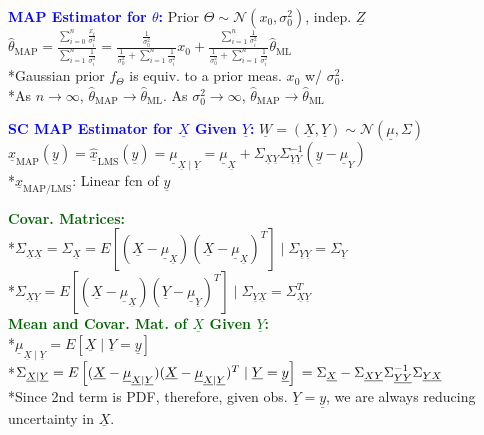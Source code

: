 \documentclass[5pt]{extarticle} %
\begin{document}
\begin{paracol}{3}
{    \textcolor{blue}{\textbf{MAP Estimator for $\theta$:}} Prior $\Theta \sim \mathcal{N} (x_0, \sigma_0^2)$, indep. $\underline{Z}$ \\
    $\hat{\theta}_{\text{MAP}} = \frac{\sum_{i=0}^n \frac{x_i}{\sigma_i^2}}{\sum_{i=1}^n \frac{1}{\sigma_i^2}} = \frac{\frac{1}{\sigma_0^2}}{\frac{1}{\sigma_0^2} + \sum_{i=1}^n \frac{1}{\sigma_i^2}} x_0 + \frac{\sum_{i=1}^n \frac{1}{\sigma_i^2}}{\frac{1}{\sigma_0^2} + \sum_{i=1}^n \frac{1}{\sigma_i^2}} \hat{\theta}_{\text{ML}}$ \\
    *Gaussian prior $f_\Theta$ is equiv. to a prior meas. $x_0$ w/ $\sigma_0^2$. \\
    *As $n \rightarrow \infty$, $\hat{\theta}_{\text{MAP}} \rightarrow \hat{\theta}_{\text{ML}}$. As $\sigma_0^2 \rightarrow \infty$, $\hat{\theta}_{\text{MAP}} \rightarrow \hat{\theta}_{\text{ML}}$ 

    \textcolor{blue}{\textbf{SC MAP Estimator for $\underline{X}$ Given $\underline{Y}$:}} $\underline{W} = (\underline{X},\underline{Y}) \sim \mathcal{N} (\underline{\mu}, \Sigma)$ \\
    $\hat{\underline{x}}_{\text{MAP}}(\underline{y}) = \hat{\underline{x}}_{\text{LMS}}(\underline{y}) = \underline{\mu}_{\underline{X} \mid \underline{Y}}= \underline{\mu}_{\underline{X}} + \Sigma_{\underline{X} \underline{Y}} \Sigma_{\underline{Y} \underline{Y}}^{-1} (\underline{y} - \underline{\mu}_Y)$ \\
    *$\hat{\underline{x}}_{\text{MAP/LMS}}$: Linear fcn of $\underline{y}$ 

    \textcolor{darkgreen}{\textbf{Covar. Matrices:}} \\
    *$\Sigma_{\underline{X} \underline{X}} = \Sigma_{\underline{X}} = E\left[(\underline{X} - \underline{\mu}_{\underline{X}})(\underline{X} - \underline{\mu}_{\underline{X}})^T\right] \mid \Sigma_{\underline{Y} \underline{Y}} = \Sigma_{\underline{Y}}$ \\ 
    *$\Sigma_{\underline{X} \underline{Y}} = E\left[(\underline{X} - \underline{\mu}_{\underline{X}})(\underline{Y} - \underline{\mu}_{\underline{Y}})^T\right] \mid \Sigma_{\underline{Y} \underline{X}} = \Sigma_{\underline{X} \underline{Y}}^T$ \\
    \textcolor{darkgreen}{\textbf{Mean and Covar. Mat. of $\underline{X}$ Given $\underline{Y}$:}} \\
    *$\underline{\mu}_{\underline{X} \mid \underline{Y}} = E[\underline{X} \mid \underline{Y} = \underline{y}]$ \\
    *$\Sigma_{\underline{X} \mid \underline{Y}} = E\left[(\underline{X} - \underline{\mu}_{\underline{X} \mid \underline{Y}})(\underline{X} - \underline{\mu}_{\underline{X} \mid \underline{Y}})^T \mid \underline{Y} = \underline{y} \right] \\
    = \Sigma_{\underline{X}} - \Sigma_{\underline{X} \underline{Y}} \Sigma_{\underline{Y} \underline{Y}}^{-1} \Sigma_{\underline{Y} \underline{X}}$ \\ 
    *Since 2nd term is PDF, therefore, given obs. $\underline{Y} = \underline{y}$, we are always reducing uncertainty in $\underline{X}$.

}
\end{paracol}
\end{document}
